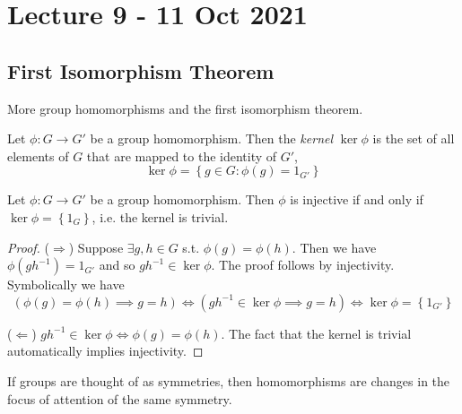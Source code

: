\section{Lecture 9 - 11 Oct 2021}
\subsection{First Isomorphism Theorem}
More group homomorphisms and the first isomorphism theorem.
\begin{definition} 
  Let $\phi:G\to G'$ be a group homomorphism. Then the \emph{kernel} $\ker\phi$ is the set
  of all elements of $G$ that are mapped to the identity of $G'$, 
  \[\ker \phi = \left\{ g\in G : \phi(g)=1_{G'} \right\}\]
  \label{kernel}
\end{definition}

\begin{theorem}
  Let $\phi:G\to G'$ be a group homomorphism. Then $\phi$ is injective if and only if
  $\ker \phi = \left\{ 1_G \right\}$, i.e. the kernel is trivial.
  \label{kernelHomomorphism}
\end{theorem}
\begin{proof}
  ($\Rightarrow$) Suppose $\exists g,h\in G$ s.t. $\phi(g)=\phi(h)$. Then we have
  $\phi(gh^{-1})=1_{G'}$ and so $gh^{-1}\in\ker\phi$. The proof follows by injectivity. 
  Symbolically we have
  \[ (\phi(g)=\phi(h) \implies g=h) \iff (gh^{-1}\in\ker\phi \implies g=h) \iff \ker\phi
  = \left\{ 1_{G'} \right\}\]

  ($\Leftarrow$) $gh^{-1}\in\ker\phi \iff \phi(g)=\phi(h)$. The fact that the kernel is
  trivial automatically implies injectivity.
\end{proof}

\begin{remark} 
  If groups are thought of as symmetries, then homomorphisms are changes in the focus of
  attention of the same symmetry.
\end{remark}

